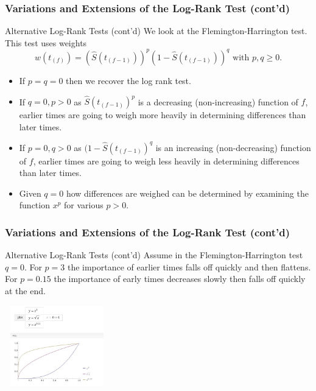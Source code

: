 \documentclass{beamer}
\theoremstyle{definition}
\begin{document}
\begin{frame}
\frametitle{Variations and Extensions of the Log-Rank Test (cont'd)}
\begin{block}{Alternative Log-Rank Tests (cont'd)}
We look at the Flemington-Harrington test. This test uses weights
\[ w(t_{(f)}) = (\hat{S}(t_{(f-1)}))^p (1-\hat{S}(t_{(f-1)}))^q \text{ with } p,q \ge 0.
\]

\begin{itemize}
\item If $p=q=0$ then we recover the log rank test.
\item If $q=0, p>0$ as $\hat{S}(t_{(f-1)})^p $ is a decreasing (non-increasing) function of $f$, earlier times are going to weigh more heavily in determining differences than later times.
\item If $p=0, q>0$ as $(1-\hat{S}(t_{(f-1)})^q $ is an increasing (non-decreasing) function of $f$, earlier times are going to weigh less heavily in determining differences than later times.
\item Given $q=0$ how differences are weighed can be determined by examining the function $x^p$ for various $p>0$.
\end{itemize}
\end{block}
\end{frame}

\begin{frame}
\frametitle{Variations and Extensions of the Log-Rank Test (cont'd)}
\begin{block}{Alternative Log-Rank Tests (cont'd)}
Assume in the Flemington-Harrington test $q=0$. For $p=3$ the importance of earlier times falls off quickly and then flattens. For $p=0.15$ the importance of early times decreases slowly then falls off quickly at the end.
\begin{center}
\includegraphics[width =4.5cm, height=3.5cm]{Ch2_Flemharringtonplot.JPG}
\end{center}
\end{block}
\end{frame}
\end{document}
